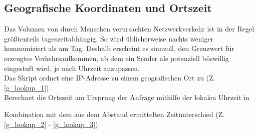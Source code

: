 \subsection{Geografische Koordinaten und Ortszeit}
Das Volumen von durch Menschen verursachten Netzwerkverkehr ist in der Regel größtenteils tageszeitabhängig. So wird üblicherweise nachts weniger kommuniziert als am Tag. Deshalb erscheint es sinnvoll, den Grenzwert für erzeugtes Verkehrsaufkommen, ab dem ein Sender als potenziell böswillig eingestuft wird, je nach Uhrzeit anzupassen. \\

Das Skript ordnet eine IP-Adresse zu einem geografischen Ort zu (Z. \ref{g_lookup_1}).\\

Berechnet die Ortszeit am Ursprung der Anfrage mithilfe der lokalen Uhrzeit in

Kombination mit dem aus dem Abstand ermittelten Zeitunterschied (Z. \ref{g_lookup_2} - \ref{g_lookup_3}).\\

